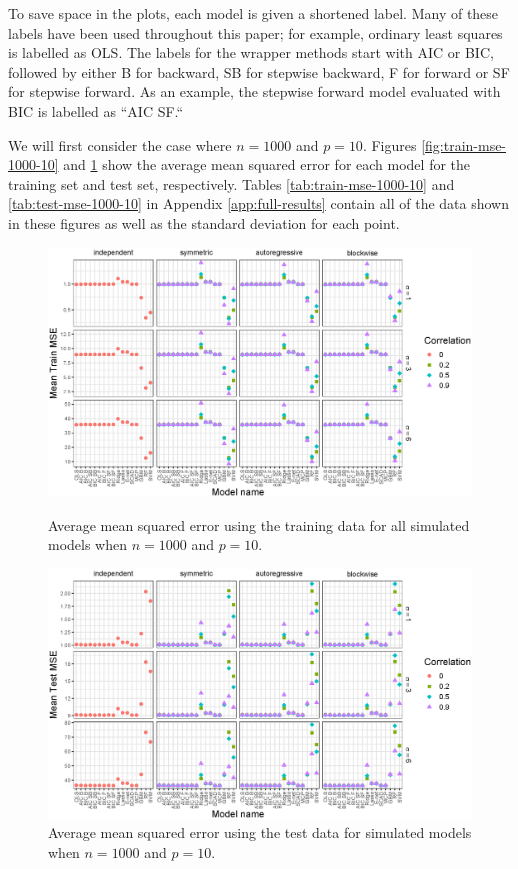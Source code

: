 \documentclass{article}
\begin{document}
To save space in the plots, each model is given a shortened label. Many of these labels have been used throughout this paper; for example, ordinary least squares is labelled as OLS. The labels for the wrapper methods start with AIC or BIC, followed by either B for backward, SB for stepwise backward, F for forward or SF for stepwise forward. As an example, the stepwise forward model evaluated with BIC is labelled as ``AIC SF.``

We will first consider the case where $n = 1000$ and $p = 10$. Figures \ref{fig:train-mse-1000-10} and \ref{fig:test-mse-1000-10} show the average mean squared error for each model for the training set and test set, respectively. Tables \ref{tab:train-mse-1000-10} and \ref{tab:test-mse-1000-10} in Appendix \ref{app:full-results} contain all of the data shown in these figures as well as the standard deviation for each point.

\begin{figure}[p!]
	\centering
	\includegraphics[width = \textwidth]{images/facet-train-mse/facet_train_mse_1000_10.eps}
	\captionsetup{width = 0.8\textwidth}
	\caption{Average mean squared error using the training data for all simulated models when $n = 1000$ and $p = 10$.}
	\label{fig:train-mse-1000-10}
	
	\bigskip
	
	\includegraphics[width = \textwidth]{images/facet-test-mse/facet_test_mse_1000_10.eps}
	\captionsetup{width = 0.8\textwidth}
	\caption{Average mean squared error using the test data for simulated models when $n = 1000$ and $p = 10$.}
	\label{fig:test-mse-1000-10}
\end{figure}
\end{document}
